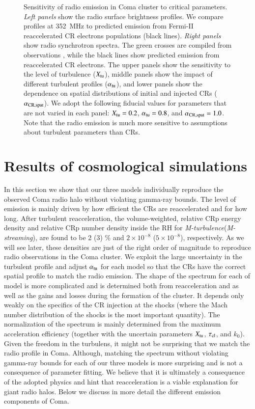 \documentclass[fleqn,usenatbib,useAMS]{mnras}
\newcommand{\Mstream}{{\it M-streaming}\xspace}
\newcommand{\Mflatturb}{{\it M-turbulence}\xspace}
\begin{document}
\begin{figure}
\caption{Sensitivity of radio emission in Coma cluster to critical
  parameters. {\it Left panels} show the radio surface brightness
  profiles. We compare profiles at 352~MHz \citep[blue lines and
    crosses,][]{brown11} to predicted emission from Fermi-II
  reaccelerated CR electrons populations (black lines). {\it Right
    panels} show radio synchrotron spectra. The green crosses are
  compiled from observations \citet{2010PhDT.......259P}, while the
  black lines show predicted emission from reaccelerated CR
  electrons. The upper panels show the sensitivity to the level of
  turbulence ($X_{\mathrm{tu}}$), middle panels show the impact of
  different turbulent profiles ($\alpha_{\mathrm{tu}}$), and lower panels
  show the dependence on spatial distributions of initial and injected
  CRs ($\alpha_{\mathrm{CR,spat}}$). We adopt the following fiducial values
  for parameters that are not varied in each panel: $X_{\mathrm{tu}}=0.2$,
  $\alpha_{\mathrm{tu}}=0.8$, and $\alpha_{\mathrm{CR,spat}}=1.0$. Note that the
  radio emission is much more sensitive to assumptions about turbulent
  parameters than CRs.}
  \label{fig:param_comp}
\end{figure}


\section{Results of cosmological simulations}
\label{sec:results}

In this section we show that our three models individually reproduce
the observed Coma radio halo without violating gamma-ray bounds. The
level of emission is mainly driven by how efficient the CRs are
reaccelerated and for how long. After turbulent reacceleration, the
volume-weighted, relative CRp energy density and relative CRp number
density inside the RH for \Mflatturb (\Mstream), are found to be 2 (3)
\% and $2\times10^{-8}$ ($5\times10^{-8}$), respectively. As we will
see later, these densities are just of the right order of magnitude to
reproduce radio observations in the Coma cluster. We exploit the large
uncertainty in the turbulent profile and adjust $\alpha_{\mathrm{tu}}$ for
each model so that the CRs have the correct spatial profile to match
the radio emission. The shape of the spectrum for each of model is
more complicated and is determined both from reacceleration and as
well as the gains and losses during the formation of the cluster. It
depends only weakly on the specifics of the CR injection at the shocks
(where the Mach number distribution of the shocks is the most
important quantity). The normalization of the spectrum is mainly
determined from the maximum acceleration efficiency (together with the
uncertain parameters $X_{\mathrm{tu}}$, $\tau_{\mathrm{cl}}$, and $k_0$). Given
the freedom in the turbulens, it might not be surprising that we match
the radio profile in Coma. Although, matching the spectrum without
violating gamma-ray bounds for each of our three models is more
surprising and is not a consequence of parameter fitting. We believe
that it is ultimately a consequence of the adopted physics and hint
that reacceleration is a viable explanation for giant radio
halos. Below we discuss in more detail the different emission
components of Coma.
\end{document}
